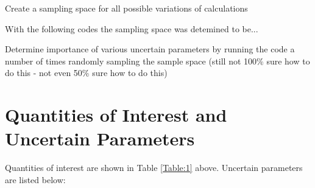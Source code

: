 \documentclass[11pt,notitlepage]{article}
\newcommand{\tss}{\textsuperscript}
\begin{document}
\begin{todolist}
\item{Create a sampling space for all possible variations of
  calculations}
    
  With the following codes the sampling space was detemined to be...


  
\item{Determine importance of various uncertain parameters
  by running the code a number of times randomly sampling
  the sample space (still not 100\% sure how to do this -
  not even 50\% sure how to do this)}
\end{todolist}



\section{Quantities of Interest and Uncertain Parameters}

Quantities of interest are shown in Table \ref{Table:1} above.
Uncertain parameters are listed below:
\end{document}
